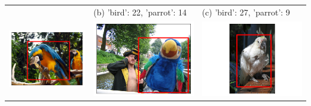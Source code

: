\documentclass[11pt,a4paper]{article}
\begin{document}
\begin{table}[t]
\begin{tabularx}{\textwidth}{XXX}
& (b) 'bird': 22, 'parrot': 14
& (c) 'bird': 27, 'parrot': 9	
\\
\includegraphics[width=0.6\columnwidth]{images/2349587_2162340_seed_ambiguous.png}
& \includegraphics[width=0.6\columnwidth]{images/2332379_2755215_supercat_unique.png}
& \includegraphics[width=0.6\columnwidth]{images/2348089_2328048_seed_ambiguous.png}

\end{tabularx}
\end{table}
\end{document}
